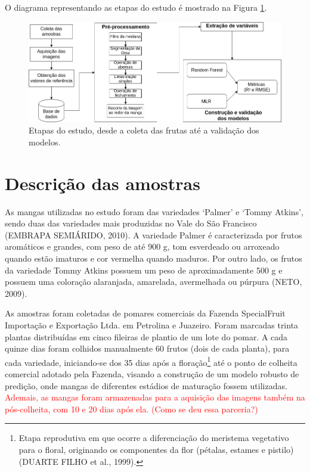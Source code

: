 O diagrama representando as etapas do estudo é mostrado na Figura \ref{fig:diag}.

\begin{figure}[H]
\centering
    \caption{Etapas do estudo, desde a coleta das frutas até a validação dos modelos.}\label{fig:diag}
    \includegraphics[scale=0.5]{img/diag.png}
\end{figure}

\section{Descrição das amostras}

As mangas utilizadas no estudo foram das variedades ‘Palmer’ e ‘Tommy Atkins’, sendo duas das variedades mais produzidas no Vale do São Francisco (EMBRAPA SEMIÁRIDO, 2010). A variedade Palmer é caracterizada por frutos aromáticos e grandes, com peso de até 900 g, tom esverdeado ou arroxeado quando estão imaturos e cor vermelha quando maduros. Por outro lado, os frutos da variedade Tommy Atkins possuem um peso de aproximadamente 500 g e possuem uma coloração alaranjada, amarelada, avermelhada ou púrpura (NETO, 2009). 

As amostras foram coletadas de pomares comerciais da Fazenda SpecialFruit Importação e Exportação Ltda. em Petrolina e Juazeiro. Foram marcadas trinta plantas distribuídas em cinco fileiras de plantio de um lote do pomar. A cada quinze dias foram colhidos manualmente 60 frutos (dois de cada planta), para cada variedade, iniciando-se dos 35 dias após a floração\footnote{\label{ftnote:floracao} Etapa reprodutiva em que ocorre a diferenciação do meristema vegetativo para o floral, originando os componentes da flor (pétalas, estames e pistilo) (DUARTE FILHO et al., 1999).} até o ponto de colheita comercial adotado pela Fazenda, visando a construção de um modelo robusto de predição, onde mangas de diferentes estádios de maturação fossem utilizadas. \textcolor{red}{Ademais, as mangas foram armazenadas para a aquisição das imagens também na pós-colheita, com 10 e 20 dias após ela. (Como se deu essa parceria?)}

